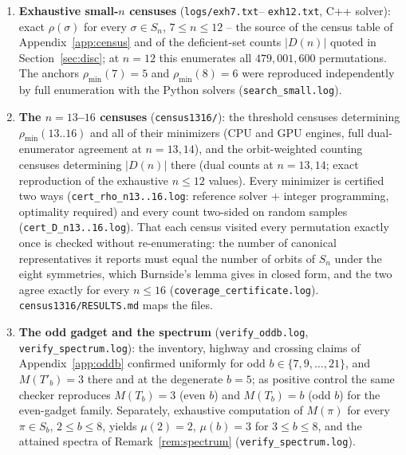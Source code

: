 \documentclass[11pt]{article}
\theoremstyle{definition}
\newcommand{\pmin}{\rho_{\min}}
\begin{document}
\begin{enumerate}
Every exact value equals $2a + 2b - 4$ and sits inside the proven window
$[2a{+}2b{-}7,\ 4a{+}2b]$ of \eqref{eq:twosided}; the two rows at $n = 480$ (differing
in $\rho$) illustrate that $\rho(\sigma_{a,b})$ tracks $a$ and $b$ separately, not just
their product.
\item \textbf{Exhaustive small-$n$ censuses} (\texttt{logs/exh7.txt}--%
\texttt{exh12.txt}, C++ solver): exact $\rho(\sigma)$ for every
$\sigma \in S_n$, $7 \le n \le 12$ -- the source of the census table of
Appendix~\ref{app:census} and of the deficient-set counts $|D(n)|$ quoted in
Section~\ref{sec:disc}; at $n = 12$ this enumerates all $479{,}001{,}600$
permutations. The anchors $\pmin(7) = 5$ and $\pmin(8) = 6$ were reproduced
independently by full enumeration with the Python solvers
(\texttt{search\_small.log}).
\item \textbf{The $n = 13$--$16$ censuses} (\texttt{census1316/}): the
threshold censuses determining $\pmin(13..16)$ and all of their minimizers
(CPU and GPU engines, full dual-enumerator agreement at $n = 13, 14$), and
the orbit-weighted counting censuses determining $|D(n)|$ there (dual counts
at $n = 13, 14$; exact reproduction of the exhaustive $n \le 12$ values).
Every minimizer is certified two ways
(\texttt{cert\_rho\_n13..16.log}: reference solver + integer programming,
optimality required) and every count two-sided on random samples
(\texttt{cert\_D\_n13..16.log}). That each census visited every permutation
exactly once is checked without re-enumerating: the number of canonical
representatives it reports must equal the number of orbits of $S_n$ under the
eight symmetries, which Burnside's lemma gives in closed form, and the two
agree exactly for every $n \le 16$ (\texttt{coverage\_certificate.log}).
\texttt{census1316/RESULTS.md} maps the files.
\item \textbf{The odd gadget and the spectrum} (\texttt{verify\_oddb.log},
\texttt{verify\_spectrum.log}): the inventory, highway and crossing claims of
Appendix~\ref{app:oddb} confirmed uniformly for odd $b \in \{7, 9, \dots, 21\}$, and
$M(T'_b) = 3$ there and at the degenerate $b = 5$; as positive control the same
checker reproduces $M(T_b) = 3$ (even $b$) and $M(T_b) = b$ (odd $b$) for the
even-gadget family. Separately, exhaustive computation of $M(\pi)$ for every
$\pi \in S_b$, $2 \le b \le 8$, yields $\mu(2) = 2$, $\mu(b) = 3$ for $3 \le b \le 8$,
and the attained spectra of Remark~\ref{rem:spectrum}
(\texttt{verify\_spectrum.log}).
\end{enumerate}
\end{document}
